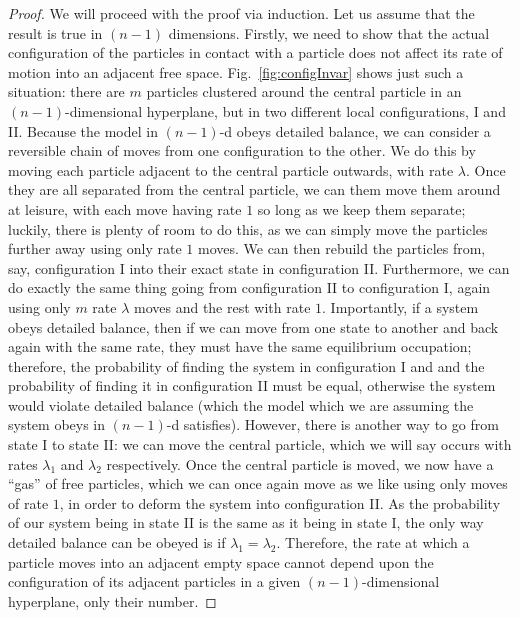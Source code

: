 \begin{proof}
We will proceed with the proof via induction. Let us assume that the result is true in $(n-1)$ dimensions. Firstly, we need to show that the actual configuration
of the particles in contact with a particle does not affect its rate of motion into an adjacent free space. Fig.~\ref{fig:configInvar} shows just such a situation: there are $m$ particles clustered around the central particle in an $(n-1)$-dimensional hyperplane, but in two different local configurations, I and II. Because the model in $(n-1)$-d obeys detailed balance, we can consider a reversible chain of moves from one configuration to the other.
We do this by moving each particle adjacent to the central particle outwards, with rate $\lambda$. Once they are all separated from the central
particle, we can them move them around at leisure, with each move having rate $1$ so long as we keep them separate; luckily, there is plenty of room to do this, as we can simply move the particles further away using only rate $1$ moves. We can then rebuild the particles from, say, configuration I into
their exact state in configuration II. Furthermore, we can do exactly the same thing going from configuration II to configuration I, again using only
$m$ rate $\lambda$ moves and the rest with rate $1$.  Importantly, if a system obeys detailed balance, then if we can move from
one state to another and back again with the same rate, they must have the same equilibrium occupation; therefore, the probability of finding the system in configuration I and and the probability of
finding it in configuration II must be equal, otherwise the system would violate detailed balance (which the model which we are assuming the system obeys
in $(n-1)$-d satisfies).
However, there is another way to go from state I to state II: we can move the central particle, which we will say occurs with rates $\lambda_1$ and
$\lambda_2$ respectively. Once the central particle is moved, we now have a ``gas'' of free particles, which we can once again move as we like using only moves of rate $1$, in order to deform the system into configuration II. As the probability of our system being in state II is the same as it being in state
I, the only way detailed balance can be obeyed is if $\lambda_1 = \lambda_2$. Therefore, the rate at which a particle moves into an adjacent empty space
cannot depend upon the configuration of its adjacent particles in a given $(n-1)$-dimensional hyperplane, only their number.


\end{proof}
